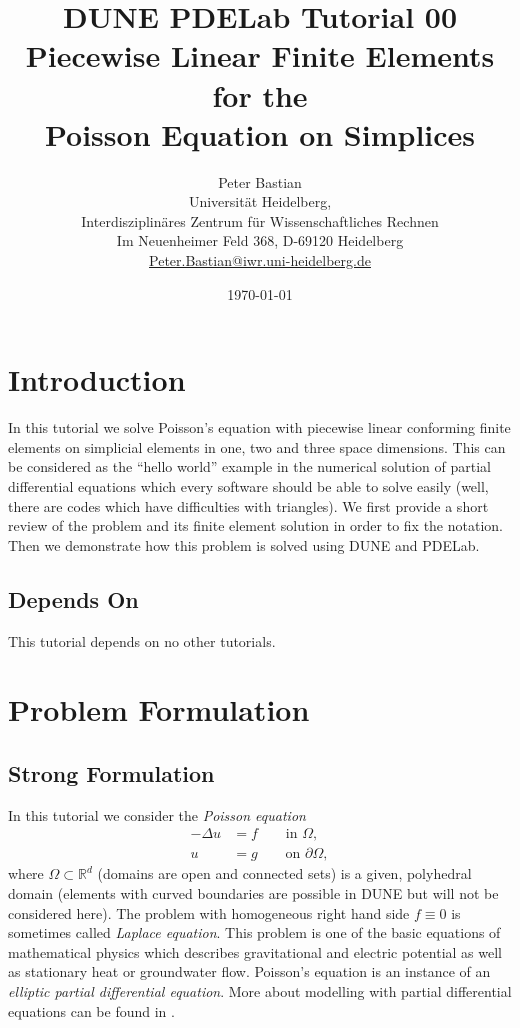 \documentclass[a4paper,12pt]{article}
\title{DUNE PDELab Tutorial 00 \\ 
Piecewise Linear Finite Elements for the\\
Poisson Equation on Simplices}
\author{Peter Bastian\\
  Universität Heidelberg, \\
  Interdisziplinäres Zentrum für Wissenschaftliches Rechnen\\
  Im Neuenheimer Feld 368, D-69120 Heidelberg\\
  \url{Peter.Bastian@iwr.uni-heidelberg.de}
}
\date{\today}
\begin{document}
\maketitle
\tableofcontents
\clearpage

\section{Introduction}

In this tutorial we solve Poisson's equation with piecewise linear conforming 
finite elements on simplicial elements in one, two and three space dimensions. 
This can be considered as the ``hello world''
example in the numerical solution of partial differential equations which
every software should be able to solve easily (well, there are codes which have
difficulties with triangles). We first provide a short review of the problem and
its finite element solution in order to fix the notation. Then we demonstrate
how this problem is solved using DUNE and PDELab.

\subsection*{Depends On} This tutorial depends on no other tutorials.

\section{Problem Formulation}

\subsection{Strong Formulation}

In this tutorial we consider the {\em Poisson equation}
\begin{subequations}
\begin{align}
-\Delta u & = f \qquad\text{in $\Omega$},\label{eq:1a}\\
u &= g \qquad\text{on $\partial\Omega$},\label{eq:1b}
\end{align}
\end{subequations}
where $\Omega\subset\mathbb{R}^d$ (domains are open and connected sets)
is a given, polyhedral domain (elements with curved
boundaries are possible in DUNE but will not be considered here). 
The problem with homogeneous right hand side $f\equiv 0$ is sometimes called
{\em Laplace equation}. This problem 
is one of the basic equations of mathematical physics which describes gravitational
and electric potential as well as stationary heat or groundwater flow.
Poisson's equation is an instance of an {\em elliptic partial differential equation}.
More about modelling with partial differential equations can be found in \cite{Eriksson,BastianII}.
\end{document}
